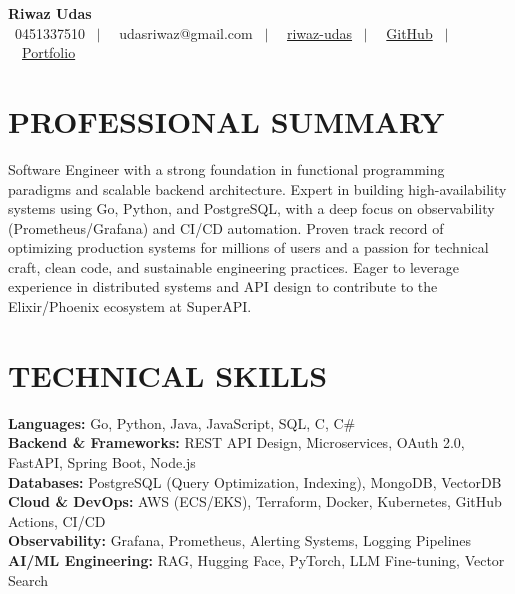 \documentclass[letterpaper,11pt]{article}
\begin{document}
\begin{center}
    \textbf{\Huge Riwaz Udas} \\ \vspace{4pt}
    \scriptsize
    \faPhone* \ 0451337510 \ $|$ \
    \faEnvelope \ udasriwaz@gmail.com \ $|$ \
    \faLinkedin \ \href{https://www.linkedin.com/in/riwaz-udas-7aab521b1/}{riwaz-udas} \ $|$ \
    \faGithub \ \href{https://github.com/riwazudas}{GitHub} \ $|$ \
    \faGlobe \ \href{https://portfolio-website-496606.web.app}{Portfolio}
\end{center}

\section{PROFESSIONAL SUMMARY}
\begin{itemize}[leftmargin=0in, label={}]
\small{\item{Software Engineer with a strong foundation in functional programming paradigms and scalable backend architecture. Expert in building high-availability systems using Go, Python, and PostgreSQL, with a deep focus on observability (Prometheus/Grafana) and CI/CD automation. Proven track record of optimizing production systems for millions of users and a passion for technical craft, clean code, and sustainable engineering practices. Eager to leverage experience in distributed systems and API design to contribute to the Elixir/Phoenix ecosystem at SuperAPI.}}
\end{itemize}

\section{TECHNICAL SKILLS}
\begin{itemize}[leftmargin=0in, label={}]
\small{\item{
\textbf{Languages:} Go, Python, Java, JavaScript, SQL, C, C\# \\
\textbf{Backend \& Frameworks:} REST API Design, Microservices, OAuth 2.0, FastAPI, Spring Boot, Node.js \\
\textbf{Databases:} PostgreSQL (Query Optimization, Indexing), MongoDB, VectorDB \\
\textbf{Cloud \& DevOps:} AWS (ECS/EKS), Terraform, Docker, Kubernetes, GitHub Actions, CI/CD \\
\textbf{Observability:} Grafana, Prometheus, Alerting Systems, Logging Pipelines \\
\textbf{AI/ML Engineering:} RAG, Hugging Face, PyTorch, LLM Fine-tuning, Vector Search
}}
\end{itemize}
\end{document}
